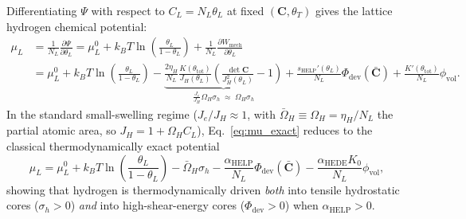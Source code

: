 \documentclass[11pt,a4paper]{article}
\begin{document}
Differentiating $\Psi$ with respect to $C_L = N_L \theta_L$ at fixed $(\mathbf{C}, \theta_T)$ gives the lattice hydrogen chemical potential:
\begin{align}
  \mu_L &= \frac{1}{N_L}\frac{\partial \Psi}{\partial \theta_L}
  = \mu_L^0 + k_B T \ln\!\left(\frac{\theta_L}{1 - \theta_L}\right)
    + \frac{1}{N_L}\frac{\partial W_{\text{mech}}}{\partial \theta_L} \nonumber\\
  &= \mu_L^0 + k_B T \ln\!\left(\frac{\theta_L}{1 - \theta_L}\right)
    - \underbrace{\frac{2\eta_H}{N_L}\frac{K(\theta_{\text{tot}})}{J_H(\theta_L)}\left(\frac{\det\mathbf{C}}{J_H^2(\theta_L)} - 1\right)}_{\displaystyle \frac{J_e}{J_H}\Omega_H \sigma_h \;\approx\; \Omega_H\sigma_h}
    + \frac{s_{\text{HELP}}'(\theta_L)}{N_L}\Phi_{\text{dev}}(\bar{\mathbf{C}})
    + \frac{K'(\theta_{\text{tot}})}{N_L}\phi_{\text{vol}}.
  \label{eq:mu_exact}
\end{align}
In the standard small-swelling regime ($J_e / J_H \approx 1$, with $\bar{\Omega}_H \equiv \Omega_H = \eta_H/N_L$ the partial atomic area, so $J_H = 1+\Omega_H C_L$), Eq.~\eqref{eq:mu_exact} reduces to the classical thermodynamically exact potential
\begin{equation}
  \boxed{
  \mu_L = \mu_L^0 + k_B T \ln\!\left(\frac{\theta_L}{1 - \theta_L}\right)
  - \bar{\Omega}_H \sigma_h
  - \frac{\alpha_{\text{HELP}}}{N_L}\Phi_{\text{dev}}(\bar{\mathbf{C}})
  - \frac{\alpha_{\text{HEDE}} K_0}{N_L}\phi_{\text{vol}},
  }
  \label{eq:mu_canonical}
\end{equation}
showing that hydrogen is thermodynamically driven \emph{both} into tensile hydrostatic cores ($\sigma_h > 0$) \emph{and} into high-shear-energy cores ($\Phi_{\text{dev}} > 0$) when $\alpha_{\text{HELP}} > 0$.
\end{document}
